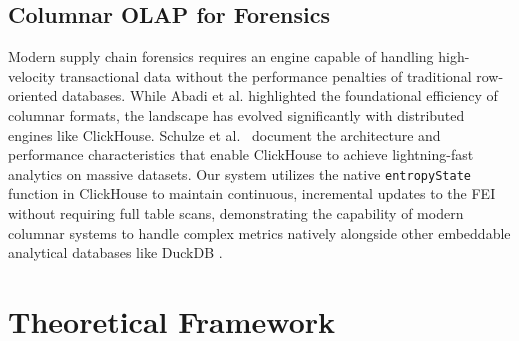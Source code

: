 \documentclass[conference]{IEEEtran}
\begin{document}
\subsection{Columnar OLAP for Forensics}
Modern supply chain forensics requires an engine capable of handling high-velocity transactional data without the performance penalties of traditional row-oriented databases. While Abadi et al. \cite{abadi2012design} highlighted the foundational efficiency of columnar formats, the landscape has evolved significantly with distributed engines like ClickHouse. Schulze et al.\ \cite{schulze2024clickhouse} document the architecture and performance characteristics that enable ClickHouse to achieve lightning-fast analytics on massive datasets. Our system utilizes the native \texttt{entropyState} function in ClickHouse to maintain continuous, incremental updates to the FEI without requiring full table scans, demonstrating the capability of modern columnar systems to handle complex metrics natively alongside other embeddable analytical databases like DuckDB \cite{raasveldt2019duckdb}.

\section{Theoretical Framework}
\end{document}
